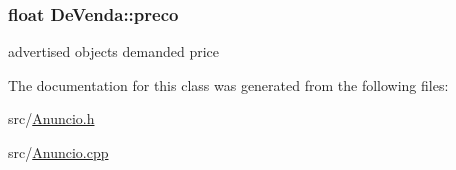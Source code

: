 \subsubsection[{preco}]{\setlength{\rightskip}{0pt plus 5cm}float De\+Venda\+::preco\hspace{0.3cm}{\ttfamily [protected]}}\label{class_de_venda_a2e2c3efbd50a6778965e5383267c261a}
advertised object\textquotesingle{}s demanded price 

The documentation for this class was generated from the following files\+:\begin{DoxyCompactItemize}
\item 
src/\hyperlink{_anuncio_8h}{Anuncio.\+h}\item 
src/\hyperlink{_anuncio_8cpp}{Anuncio.\+cpp}\end{DoxyCompactItemize}
